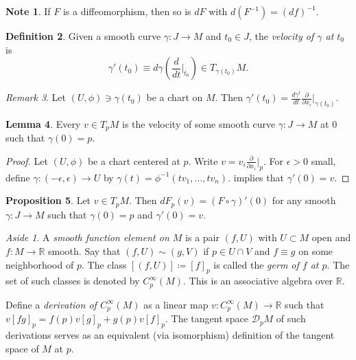 \documentclass[10pt,letterpaper,cm]{nupset}
\theoremstyle{definition}
\newtheorem{definition}{Definition}[subsection]
\newtheorem{note}[definition]{Note}
\theoremstyle{theorem}
\newtheorem{lemma}[definition]{Lemma}
\newtheorem{prop}[definition]{Proposition}
\theoremstyle{remark}
\newtheorem{remark}[definition]{Remark}
\newtheorem*{aside}{Aside}
\newcommand{\R}{\mathbb R}
\newcommand{\1}{\mathbf{1}}
\newcommand{\0}{\vec 0}
\begin{document}
\begin{note}
If $F$ is a diffeomorphism, then so is $dF$ with $d(F^{-1}) = (df)^{-1}$.
\end{note}

\begin{definition}
Given a smooth curve $\gamma : J \to M$ and $t_0 \in J$, the \textit{velocity of $\gamma$ at $t_0$} is  $$\gamma'(t_0) \equiv d\gamma \left(\frac{d}{dt}\bigr\rvert_{t_0} \right) \in T_{\gamma(t_0)}M.$$
\end{definition}

\begin{remark}\label{rem}
Let $(U, \phi) \ni \gamma(t_0)$ be a chart on $M$. Then $\gamma'(t_0) = \frac{d\gamma^i}{dt} \frac{\partial}{\partial{x_i}}\bigr\rvert_{\gamma(t_0)}$.
\end{remark}

\begin{lemma}
Every $v \in T_pM$ is the velocity of some smooth curve $\gamma : J \to M$ at $0$ such that $\gamma(0)=p$.
\end{lemma}
\begin{proof}
Let $(U, \phi)$ be a chart centered at $p$. Write $v = v_i \frac{\partial}{\partial{x_i}}\bigr\rvert_{p}$. For $\epsilon >0$ small, define $\gamma: (-\epsilon , \epsilon) \to U$ by $\gamma(t) = \phi^{-1}(tv_1, \ldots, tv_n)$.  implies that $\gamma'(0) = v$.
\end{proof}

\begin{prop}
Let $v \in T_pM$. Then $dF_p(v) = (F \circ \gamma)'(0)$ for any smooth $\gamma : J \to M$ such that $\gamma(0)=p$ and $\gamma'(0) =v$.
\end{prop}

\begin{aside}
A \textit{smooth function element on $M$} is a pair $(f, U)$ with $U\subset M$ open and $f: M \to \R$ smooth. Say that $(f, U) \sim (g, V)$ if $p\in U \cap V$ and $f \equiv g$ on some neighborhood of $p$. The class $[(f, U)]\coloneqq [f]_p$ is called the \textit{germ of $f$ at $p$}. The set of such classes is denoted by $C^{\infty}_p(M)$. This is an associative algebra over $\R$. 
\medskip

 Define a \textit{derivation of $C^{\infty}_p(M)$} as a linear map $v: C^{\infty}_p(M) \to \R$ such that $v[fg]_p = f(p)v[g]_p+g(p)v[f]_p$.  The tangent space $\mathcal{D}_pM$ of such derivations serves as an equivalent (via isomorphism) definition of the tangent space of $M$ at $p$.
\end{aside}
\end{document}

